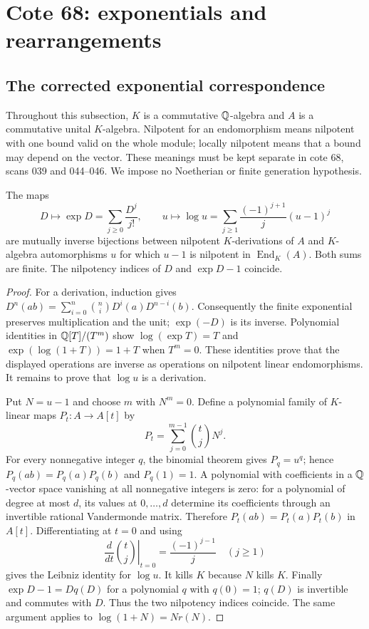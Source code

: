 \section{Cote 68: exponentials and rearrangements}\label{sec:part-c}

\subsection{The corrected exponential correspondence}
Throughout this subsection, $K$ is a commutative ${\mathbb{Q}}$-algebra and $A$ is a
commutative unital $K$-algebra. Nilpotent for an endomorphism means nilpotent
with one bound valid on the whole module; locally nilpotent means that a
bound may depend on the vector. These meanings must be kept separate in
cote 68, scans 039 and 044--046. We impose no Noetherian or finite generation
hypothesis.

\begin{theorem}\label{C-exp-log}
The maps
\[
 D\longmapsto \exp D=\sum_{j\geq0}\frac{D^j}{j!},\qquad
 u\longmapsto \log u=\sum_{j\geq1}\frac{(-1)^{j+1}}j(u-1)^j
\]
are mutually inverse bijections between nilpotent $K$-derivations of $A$
and $K$-algebra automorphisms $u$ for which $u-1$ is nilpotent in
$\operatorname{End}_K(A)$. Both sums are finite. The nilpotency indices of
$D$ and $\exp D-1$ coincide.
\end{theorem}
\begin{proof}
For a derivation, induction gives
$D^n(ab)=\sum_{i=0}^n\binom niD^i(a)D^{n-i}(b)$.
Consequently the finite exponential preserves multiplication and the unit;
$\exp(-D)$ is its inverse. Polynomial identities in ${\mathbb{Q}}[T]/(T^m)$ show
$\log(\exp T)=T$ and $\exp(\log(1+T))=1+T$ when $T^m=0$.
These identities prove that the displayed operations are inverse as
operations on nilpotent linear endomorphisms. It remains to prove that
$\log u$ is a derivation.

Put $N=u-1$ and choose $m$ with $N^m=0$. Define a polynomial family of
$K$-linear maps $P_t:A\to A[t]$ by
\[
 P_t=\sum_{j=0}^{m-1}\binom tjN^j.
\]
For every nonnegative integer $q$, the binomial theorem gives $P_q=u^q$;
hence $P_q(ab)=P_q(a)P_q(b)$ and $P_q(1)=1$. A polynomial with coefficients
in a ${\mathbb{Q}}$-vector space vanishing at all nonnegative integers is zero:
for a polynomial of degree at most $d$, its values at $0,\ldots,d$ determine
its coefficients through an invertible rational Vandermonde matrix.
Therefore $P_t(ab)=P_t(a)P_t(b)$ in $A[t]$. Differentiating at $t=0$ and
using
\[
 \left.\frac{d}{dt}\binom tj\right|_{t=0}
 =\frac{(-1)^{j-1}}j\quad(j\geq1)
\]
gives the Leibniz identity for $\log u$. It kills $K$ because $N$ kills $K$.
Finally $\exp D-1=Dq(D)$ for a polynomial $q$ with $q(0)=1$;
$q(D)$ is invertible and commutes with $D$. Thus the two nilpotency
indices coincide. The same argument applies to $\log(1+N)=Nr(N)$.
\end{proof}

